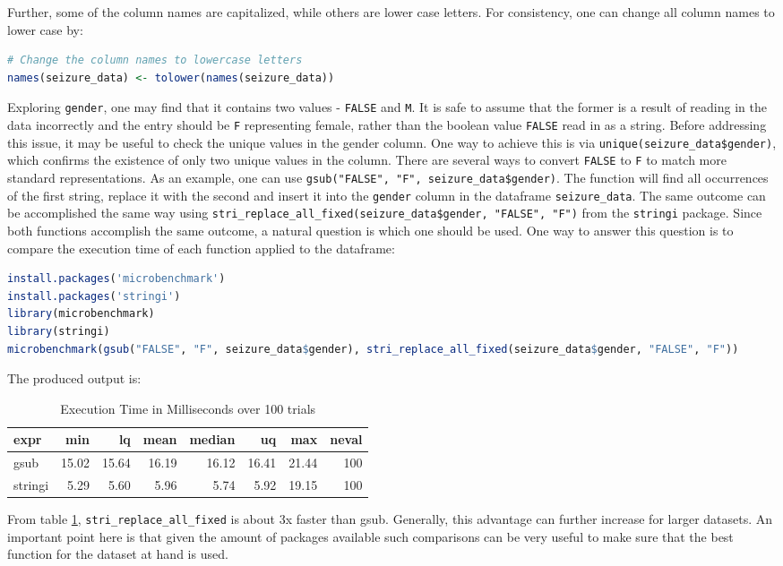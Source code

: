 Further, some of the column names are capitalized, while others are lower case letters. For consistency, one can change all column names to lower case by:
\begin{lstlisting}[language=R]
# Change the column names to lowercase letters
names(seizure_data) <- tolower(names(seizure_data))
\end{lstlisting}

Exploring \verb|gender|, one may find that it contains two values - \verb|FALSE| and \verb|M|. It is safe to assume that the former is a result of reading in the data incorrectly and the entry should be \verb|F| representing female, rather than the boolean value \verb|FALSE| read in as a string. Before addressing this issue, it may be useful to check the unique values in the gender column. One way to achieve this is via \verb|unique(seizure_data$gender)|, which confirms the existence of only two unique values in the column. There are several ways to convert \verb|FALSE| to \verb|F| to match more standard representations. As an example, one can use \verb|gsub("FALSE", "F", seizure_data$gender)|. The function will find all occurrences of the first string, replace it with the second and insert it into the \verb|gender| column in the dataframe \verb|seizure_data|. The same outcome can be accomplished the same way using \verb|stri_replace_all_fixed(seizure_data$gender, "FALSE", "F")| from the \verb|stringi| \cite{stringi} package. Since both functions accomplish the same outcome, a natural question is which one should be used. One way to answer this question is to compare the execution time of each function applied to the dataframe:
\begin{lstlisting}[language=R]
install.packages('microbenchmark')
install.packages('stringi')
library(microbenchmark)
library(stringi)
microbenchmark(gsub("FALSE", "F", seizure_data$gender), stri_replace_all_fixed(seizure_data$gender, "FALSE", "F"))
\end{lstlisting}
The produced output is:
\begin{table}[h]
  \centering
  \label{tab:execution_time}
  \begin{tabular}{lrrrrrrr}
    \hline
    expr & min & lq & mean & median & uq & max & neval \\
    \hline
    gsub & 15.02 & 15.64 & 16.19 & 16.12 & 16.41 & 21.44 & 100 \\
    stringi & 5.29 & 5.60 & 5.96 & 5.74 & 5.92 & 19.15 & 100 \\
    \hline
  \end{tabular}
  \caption{Execution Time in Milliseconds over 100 trials}
  \label{tbl:substr}
\end{table}
From table \ref{tbl:substr}, \verb|stri_replace_all_fixed| is about 3x faster than gsub. Generally, this advantage can further increase for larger datasets. An important point here is that given the amount of packages available such comparisons can be very useful to make sure that the best function for the dataset at hand is used.

